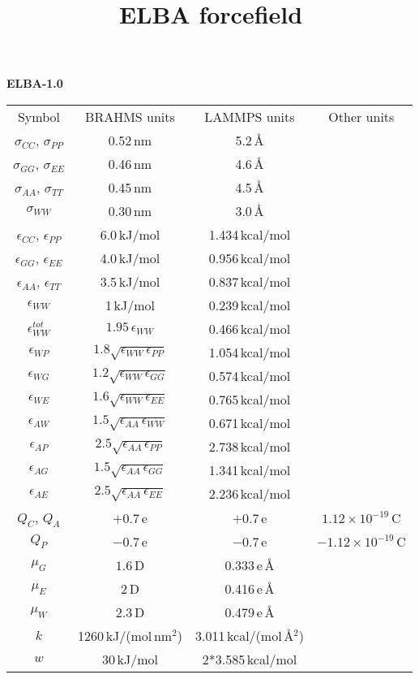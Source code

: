 \documentclass[10pt]{article}
\title{ELBA forcefield}
\date{}
\begin{document}
\large{
\bf{ELBA-1.0}}
\medskip
\begin{table*}[!ht]
\begin{tabular}{|c|c|c|c|}
Symbol & BRAHMS units & LAMMPS units & Other units \\
$\sigma_{CC}$, $\sigma_{PP}$ & 0.52\,nm & 5.2\,\AA&\\
$\sigma_{GG}$, $\sigma_{EE}$ & 0.46\,nm & 4.6\,\AA&\\
$\sigma_{AA}$, $\sigma_{TT}$ & 0.45\,nm & 4.5\,\AA&\\
$\sigma_{WW}$ & 0.30\,nm & 3.0\,\AA&\\
$\epsilon_{CC}$, $\epsilon_{PP}$ & 6.0\,kJ/mol & 1.434\,kcal/mol&\\
$\epsilon_{GG}$, $\epsilon_{EE}$ & 4.0\,kJ/mol & 0.956\,kcal/mol&\\
$\epsilon_{AA}$, $\epsilon_{TT}$  & 3.5\,kJ/mol & 0.837\,kcal/mol&\\
$\epsilon_{WW}$  & 1\,kJ/mol & 0.239\,kcal/mol&\\
$\epsilon^{tot}_{WW}$  & $1.95\,\epsilon_{WW}$ & 0.466\,kcal/mol&\\
$\epsilon_{WP}$ &$1.8\sqrt{\epsilon_{WW}\,\epsilon_{PP}} $ & 1.054\,kcal/mol&\\
$\epsilon_{WG}$ & $1.2\sqrt{\epsilon_{WW}\,\epsilon_{GG}} $ & 0.574\,kcal/mol&\\
$\epsilon_{WE}$  & $1.6\sqrt{\epsilon_{WW}\,\epsilon_{EE}} $ & 0.765\,kcal/mol&\\
$\epsilon_{AW}$  & $1.5\sqrt{\epsilon_{AA}\,\epsilon_{WW}} $ & 0.671\,kcal/mol&\\
$\epsilon_{AP}$  & $2.5\sqrt{\epsilon_{AA}\,\epsilon_{PP}} $ & 2.738\,kcal/mol&\\
$\epsilon_{AG}$  & $1.5\sqrt{\epsilon_{AA}\,\epsilon_{GG}} $ & 1.341\,kcal/mol&\\
$\epsilon_{AE}$  & $2.5\sqrt{\epsilon_{AA}\,\epsilon_{EE}} $ & 2.236\,kcal/mol&\\
 $Q_C$, $Q_A$   &$+0.7$\,e &$+0.7$\,e & $1.12\times10^{-19}$\,C\\
 $Q_P$  &$-0.7$\,e &$-0.7$\,e & $-1.12\times10^{-19}$\,C\\
 $\mu_G$ & $1.6$\,D & 0.333\,e\,\AA&\\
 $\mu_E$ & $2$\,D & 0.416\,e\,\AA&\\
 $\mu_W$ &$2.3$\,D & 0.479\,e\,\AA&\\
 $k$& 1260\,kJ/(mol\,nm$^{2}$)& 3.011\,kcal/(mol\,\AA$^2$)&\\
 $w$& 30\,kJ/mol& 2*3.585\,kcal/mol&\\

\end{tabular}
\end{table*}
\end{document}

